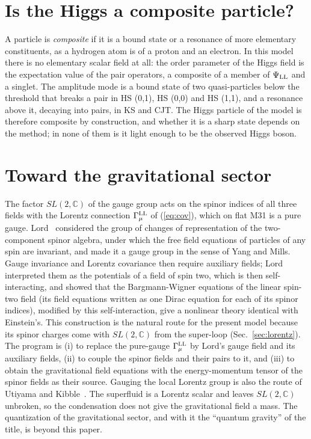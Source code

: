 \documentclass[aps,prd,twocolumn,superscriptaddress,nofootinbib,floatfix,longbibliography]{revtex4-2}
\newcommand{\LL}{{\rm LL}}
\begin{document}
\section{Is the Higgs a composite particle?}
\label{sec:composite}

A particle is \emph{composite} if it is a bound state or a resonance of more elementary constituents, as a hydrogen atom
is of a proton and an electron. In this model there is no elementary scalar field at all: the order parameter of the
Higgs field is the expectation value of the pair operators, a composite of a member of $\Psi_\LL$ and a singlet. The
amplitude mode is a bound state of two quasi-particles below the threshold that breaks a pair in HS (0,1), HS (0,0) and HS
(1,1), and a resonance above it, decaying into pairs, in KS and CJT. The Higgs particle of the model is therefore
composite by construction, and whether it is a sharp state depends on the method; in none of them is it light enough to
be the observed Higgs boson.

\section{Toward the gravitational sector}
\label{sec:gravity}

The factor $SL(2,\mathbb C)$ of the gauge group acts on the spinor indices of all three fields with the Lorentz connection
$\Gamma^\LL_\mu$ of (\ref{eq:cov}), which on flat M31 is a pure gauge. Lord~\cite{Lord1971} considered the group of
changes of representation of the two-component spinor algebra, under which the free field equations of particles of any
spin are invariant, and made it a gauge group in the sense of Yang and Mills. Gauge invariance and Lorentz covariance
then require auxiliary fields; Lord interpreted them as the potentials of a field of spin two, which is then
self-interacting, and showed that the Bargmann-Wigner equations of the linear spin-two field (its field equations
written as one Dirac equation for each of its spinor indices), modified by this self-interaction, give a nonlinear theory
identical with Einstein's. This construction is the natural route for the
present model because its spinor charges come with $SL(2,\mathbb C)$ from the super-loop (Sec.~\ref{sec:lorentz}). The
program is (i) to replace the pure-gauge $\Gamma^\LL_\mu$ by Lord's gauge field and its auxiliary fields, (ii) to couple
the spinor fields and their pairs to it, and (iii) to obtain the gravitational field equations with the
energy-momentum tensor of the spinor fields as their source. Gauging the local Lorentz group is also the route of Utiyama
and Kibble~\cite{Utiyama1956,Kibble1961,Hehl1976}. The superfluid is a Lorentz scalar and leaves $SL(2,\mathbb C)$
unbroken, so the condensation does not give the gravitational field a mass. The quantization of the gravitational sector,
and with it the ``quantum gravity'' of the title, is beyond this paper.
\end{document}
